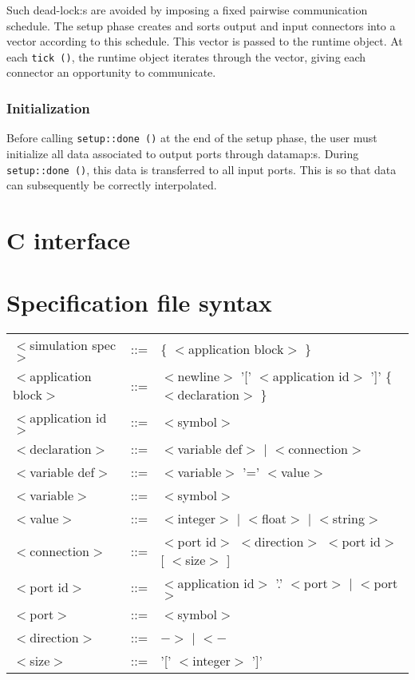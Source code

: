 \documentclass[a4paper]{report}
\begin{document}
Such dead-lock:s are avoided by imposing a fixed pairwise
communication schedule.  The setup phase creates and sorts output and
input connectors into a vector according to this schedule.  This
vector is passed to the runtime object.  At each \verb|tick ()|, the
runtime object iterates through the vector, giving each connector an
opportunity to communicate.

\subsection{Initialization}

Before calling \verb|setup::done ()| at the end of the setup phase,
the user must initialize all data associated to output ports through
datamap:s.  During \verb|setup::done ()|, this data is transferred to
all input ports.  This is so that data can subsequently be correctly
interpolated.

\appendix

\chapter{C interface}

\chapter{Specification file syntax}

\newcommand{\nt}[1]{$<$#1$>$}

\begin{tabular}{lcl}
\nt{simulation spec}   & ::= & \{ \nt{application block} \} \\
\nt{application block} & ::= & \nt{newline} '[' \nt{application id} ']' \{ \nt{declaration}
\} \\
\nt{application id}    & ::= & \nt{symbol} \\
\nt{declaration}       & ::= & \nt{variable def} $|$ \nt{connection} \\
\nt{variable def}      & ::= & \nt{variable} '=' \nt{value} \\
\nt{variable}	       & ::= & \nt{symbol} \\
\nt{value} 	       & ::= & \nt{integer} $|$ \nt{float} $|$ \nt{string} \\
\nt{connection}	       & ::= & \nt{port id} \nt{direction} \nt{port id} [ \nt{size} ] \\
\nt{port id}	       & ::= & \nt{application id} '.' \nt{port} $|$
\nt{port} \\
\nt{port}	       & ::= & \nt{symbol} \\
\nt{direction}	       & ::= & $->$ $|$ $<-$ \\
\nt{size}	       & ::= & '[' \nt{integer} ']' \\
\end{tabular}
\end{document}
